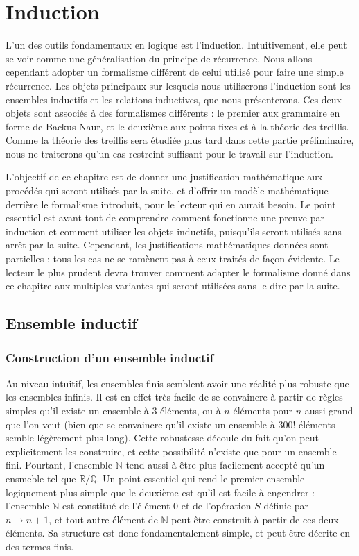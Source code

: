 \chapter{Induction}
\label{chp.induction}

\minitoc

L'un des outils fondamentaux en logique est l'induction. Intuitivement, elle
peut se voir comme une généralisation du principe de récurrence. Nous allons
cependant adopter un formalisme différent de celui utilisé pour faire une simple
récurrence. Les objets principaux sur lesquels nous utiliserons l'induction sont
les ensembles inductifs et les relations inductives, que nous présenterons. Ces
deux objets sont associés à des formalismes différents : le premier aux
grammaire en forme de Backus-Naur, et le deuxième aux points fixes et à la
théorie des treillis. Comme la théorie des treillis sera étudiée plus tard dans
cette partie préliminaire, nous ne traiterons qu'un cas restreint suffisant pour
le travail sur l'induction.

L'objectif de ce chapitre est de donner une justification mathématique aux
procédés qui seront utilisés par la suite, et d'offrir un modèle mathématique
derrière le formalisme introduit, pour le lecteur qui en aurait besoin. Le point
essentiel est avant tout de comprendre comment fonctionne une preuve par
induction et comment utiliser les objets inductifs, puisqu'ils seront utilisés
sans arrêt par la suite. Cependant, les justifications mathématiques données
sont partielles : tous les cas ne se ramènent pas à ceux traités de façon
évidente. Le lecteur le plus prudent devra trouver comment adapter le formalisme
donné dans ce chapitre aux multiples variantes qui seront utilisées sans le dire
par la suite.

\section{Ensemble inductif}

\subsection{Construction d'un ensemble inductif}

Au niveau intuitif, les ensembles finis semblent avoir une réalité plus
robuste que les ensembles infinis. Il est en effet très facile de se convaincre
à partir de règles simples qu'il existe un ensemble à $3$ éléments, ou à $n$
éléments pour $n$ aussi grand que l'on veut (bien que se convaincre qu'il existe
un ensemble à $300!$ éléments semble légèrement plus long). Cette robustesse
découle du fait qu'on peut explicitement les construire, et cette possibilité
n'existe que pour un ensemble fini. Pourtant, l'ensemble $\mathbb N$ tend aussi
à être plus facilement accepté qu'un ensmeble tel que $\mathbb R / \mathbb Q$.
Un point essentiel qui rend le premier ensemble logiquement plus simple que le
deuxième est qu'il est facile à engendrer : l'ensemble $\mathbb N$ est constitué
de l'élément $0$ et de l'opération $S$ définie par $n \mapsto n + 1$, et tout
autre élément de $\mathbb N$ peut être construit à partir de ces deux éléments.
Sa structure est donc fondamentalement simple, et peut être décrite en des
termes finis.

